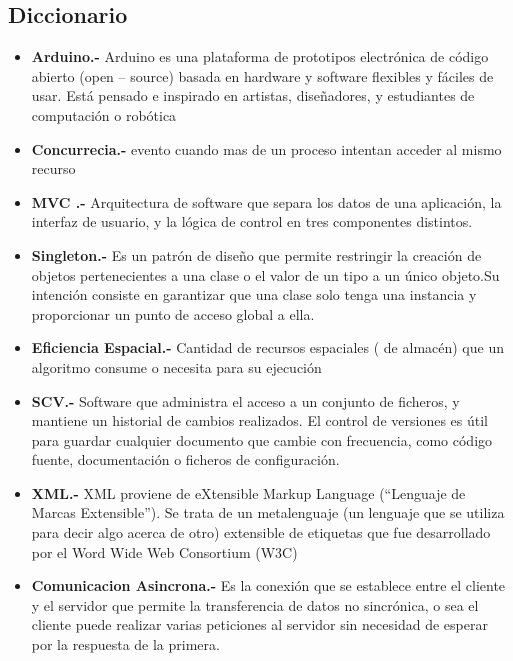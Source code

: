\documentclass[letterpaper,12pt]{article}
\begin{document}
{\subsection{Diccionario}
\begin{itemize}
	
	\item \textbf{Arduino.- } Arduino es una plataforma de prototipos electrónica de código abierto (open – source) basada en hardware y software flexibles y  fáciles de usar. Está pensado e inspirado en artistas, diseñadores, y estudiantes de computación o robótica
	
	\item \textbf{Concurrecia.- } evento cuando  mas de un proceso intentan acceder al mismo recurso 
	
	\item \textbf{MVC .- }Arquitectura de software que separa los datos de una aplicación, la interfaz de usuario, y la lógica de control en tres componentes distintos.
	
	\item \textbf{Singleton.- } Es un patrón de diseño que permite restringir la creación de objetos pertenecientes a una clase o el valor de un tipo a un único objeto.Su intención consiste en garantizar que una clase solo tenga una instancia y proporcionar un punto de acceso global a ella.
	
	\item \textbf{Eficiencia Espacial.- }Cantidad de recursos espaciales ( de  almacén) que un algoritmo consume o necesita para su 
	ejecución
	
	\item \textbf{SCV.- }  Software que administra el acceso a un conjunto de ficheros, y mantiene un historial de cambios realizados. El control de versiones es útil para guardar cualquier documento que cambie con frecuencia, como código fuente, documentación o ficheros de configuración.
	
	\item \textbf{XML.- } XML proviene de eXtensible Markup Language (“Lenguaje de Marcas Extensible”). Se trata de un metalenguaje (un lenguaje que se utiliza para decir algo acerca de otro) extensible de etiquetas que fue desarrollado por el Word Wide Web Consortium (W3C)
	
	\item \textbf{Comunicacion Asincrona.- }Es la conexión que se establece entre el cliente y el servidor que permite la transferencia de datos no sincrónica, o sea el cliente puede realizar varias peticiones al servidor sin necesidad de esperar por la respuesta de la primera. 
	

\end{itemize}}
\end{document}
